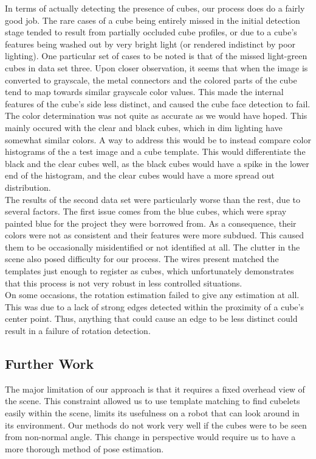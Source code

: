 \documentclass[conference]{IEEEtran}
\begin{document}
In terms of actually detecting the presence of cubes, our process does do a fairly good job.  The rare cases of a cube being entirely missed in the initial detection stage tended to result from partially occluded cube profiles, or due to a cube's features being washed out by very bright light (or rendered indistinct by poor lighting).  One particular set of cases to be noted is that of the missed light-green cubes in data set three.  Upon closer observation, it seems that when the image is converted to grayscale, the metal connectors and the colored parts of the cube tend to map towards similar grayscale color values.  This made the internal features of the cube's side less distinct, and caused the cube face detection to fail.\\

The color determination was not quite as accurate as we would have hoped.  This mainly occured with the clear and black cubes, which in dim lighting have somewhat similar colors.  A way to address this would be to instead compare color histograms of the a test image and a cube template.  This would differentiate the black and the clear cubes well, as the black cubes would have a spike in the lower end of the histogram, and the clear cubes would have a more spread out distribution.\\

The results of the second data set were particularly worse than the rest, due to several factors.  The first issue comes from the blue cubes, which were spray painted blue for the project they were borrowed from.  As a consequence, their colors were not as consistent and their features were more subdued. This caused them to be occasionally misidentified or not identified at all.  The clutter in the scene also posed difficulty for our process.  The wires present matched the templates just enough to register as cubes, which unfortunately demonstrates that this process is not very robust in less controlled situations.\\

On some occasions, the rotation estimation failed to give any estimation at all.  This was due to a lack of strong edges detected within the proximity of a cube's center point.  Thus, anything that could cause an edge to be less distinct could result in a failure of rotation detection.

\subsection{Further Work}
The major limitation of our approach is that it requires a fixed overhead view of the scene.  This constraint allowed us to use template matching to find cubelets easily within the scene, limits its usefulness on a robot that can look around in its environment.  Our methods do not work very well if the cubes were to be seen from non-normal angle.  This change in perspective would require us to have a more thorough method of pose estimation.  \\
\end{document}
